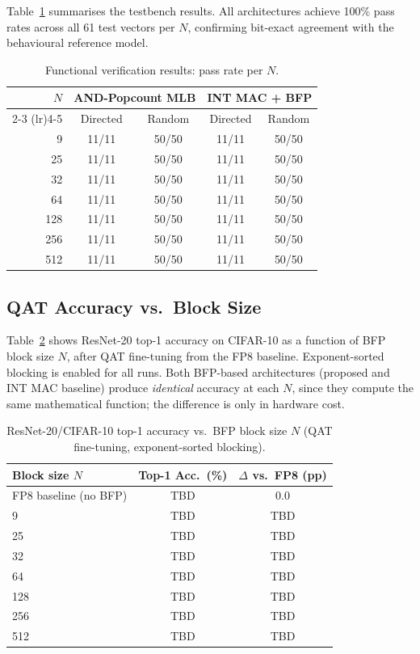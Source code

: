 \documentclass[conference]{IEEEtran}
\begin{document}
Table~\ref{tab:verification} summarises the testbench results.
All architectures achieve 100\% pass rates across all 61 test
vectors per $N$, confirming bit-exact agreement with the
behavioural reference model.

\begin{table}[htbp]
\centering
\caption{Functional verification results: pass rate per $N$.}
\label{tab:verification}
\footnotesize
\begin{tabular}{rcccc}
\toprule
$N$ & \multicolumn{2}{c}{AND-Popcount MLB} &
      \multicolumn{2}{c}{INT MAC + BFP} \\
\cmidrule(lr){2-3} \cmidrule(lr){4-5}
& Directed & Random & Directed & Random \\
\midrule
9   & 11/11 & 50/50 & 11/11 & 50/50 \\
25  & 11/11 & 50/50 & 11/11 & 50/50 \\
32  & 11/11 & 50/50 & 11/11 & 50/50 \\
64  & 11/11 & 50/50 & 11/11 & 50/50 \\
128 & 11/11 & 50/50 & 11/11 & 50/50 \\
256 & 11/11 & 50/50 & 11/11 & 50/50 \\
512 & 11/11 & 50/50 & 11/11 & 50/50 \\
\bottomrule
\end{tabular}
\end{table}

\subsection{QAT Accuracy vs.\ Block Size}
\label{ssec:qat_results}

Table~\ref{tab:qat} shows ResNet-20 top-1 accuracy on CIFAR-10
as a function of BFP block size $N$, after QAT fine-tuning from
the FP8 baseline.  Exponent-sorted blocking is enabled for all
runs.  Both BFP-based architectures (proposed and INT MAC baseline)
produce \emph{identical} accuracy at each $N$, since they compute
the same mathematical function; the difference is only in hardware
cost.

\begin{table}[htbp]
\centering
\caption{ResNet-20/CIFAR-10 top-1 accuracy vs.\ BFP block size $N$
         (QAT fine-tuning, exponent-sorted blocking).}
\label{tab:qat}
\begin{tabular}{lcc}
\toprule
Block size $N$ & Top-1 Acc.\ (\%) & $\Delta$ vs.\ FP8 (pp) \\
\midrule
FP8 baseline (no BFP) & TBD & 0.0 \\
\midrule
9   & TBD & TBD \\
25  & TBD & TBD \\
32  & TBD & TBD \\
64  & TBD & TBD \\
128 & TBD & TBD \\
256 & TBD & TBD \\
512 & TBD & TBD \\
\bottomrule
\end{tabular}
\end{table}
\end{document}
